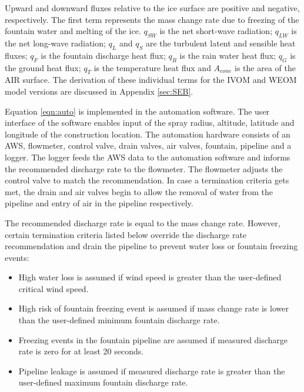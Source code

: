 \documentclass[tc, manuscript]{copernicus}
\begin{document}
Upward and downward fluxes relative to the ice surface are positive and negative, respectively. The first term
represents the mass change rate due to freezing of the fountain water and melting of the ice. $q_{SW}$ is the
net short-wave radiation; $q_{LW}$ is the net long-wave radiation; $q_{L}$ and $q_{S}$ are the turbulent latent
and sensible heat fluxes; $q_{F}$ is the fountain discharge heat flux; $q_{R}$ is the rain water heat flux;
$q_{G}$ is the ground heat flux; $q_{T}$ is the temperature heat flux and $A_{cone}$ is the area of the AIR
surface. The derivation of these individual terms for the IVOM and WEOM model versions are discussed in 
Appendix \ref{sec:SEB}.

Equation \ref{eqn:auto} is implemented in the automation software. The user interface of the software enables
input of the spray radius, altitude, latitude and longitude of the construction location. The automation
hardware consists of an AWS, flowmeter, control valve, drain valves, air valves, fountain, pipeline and a
logger. The logger feeds the AWS data to the automation software and informs the recommended discharge rate to
the flowmeter. The flowmeter adjusts the control valve to match the recommendation. In case a termination
criteria gets met, the drain and air valves begin to allow the removal of water from the pipeline and entry of
air in the pipeline respectively.

The recommended discharge rate is equal to the mass change rate. However, certain termination criteria listed
below override the discharge rate recommendation and drain the pipeline to prevent water loss or fountain
freezing events:

\begin{itemize}

\item High water loss is assumed if wind speed is greater than the user-defined critical wind speed.

\item High risk of fountain freezing event is assumed if mass change rate is lower than the user-defined minimum fountain discharge rate. 

\item Freezing events in the fountain pipeline are assumed if measured discharge rate is zero for at least 20
  seconds. 

\item Pipeline leakage is assumed if measured discharge rate is greater than the user-defined maximum fountain discharge rate.

\end{itemize}
\end{document}
